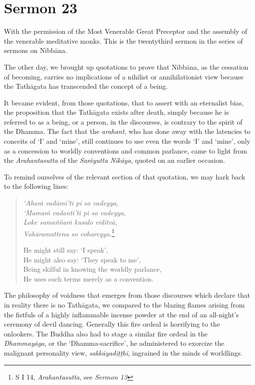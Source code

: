 \chapter{Sermon 23}

\NibbanaOpeningQuote

With the permission of the Most Venerable Great Preceptor and the assembly of the venerable meditative monks. This is the twentythird sermon in the series of sermons on Nibbāna.

The other day, we brought up quotations to prove that Nibbāna, as the cessation of becoming, carries no implications of a nihilist or annihilationist view because the Tathāgata has transcended the concept of a being.

It became evident, from those quotations, that to assert with an eternalist bias, the proposition that the Tathāgata exists after death, simply because he is referred to as a being, or a person, in the discourses, is contrary to the spirit of the Dhamma. The fact that the \emph{arahant}, who has done away with the latencies to conceits of `I' and `mine', still continues to use even the words `I' and `mine', only as a concession to worldly conventions and common parlance, came to light from the \emph{Arahantasutta} of the \emph{Saṁyutta Nikāya}, quoted on an earlier occasion.

To remind ourselves of the relevant section of that quotation, we may hark back to the following lines:

\begin{quote}
\emph{`Ahaṁ vadāmī'ti pi so vadeyya,}\\
\emph{`Mamaṁ vadantī'ti pi so vadeyya,}\\
\emph{Loke samaññaṁ kusalo viditvā,}\\
\emph{Vohāramattena so vohareyya.}\footnote{S I 14, \emph{Arahantasutta}, see \emph{Sermon 13}}

He might still say: `I speak',\\
He might also say: `They speak to me',\\
Being skilful in knowing the worldly parlance,\\
He uses such terms merely as a convention.
\end{quote}

The philosophy of voidness that emerges from those discourses which declare that in reality there is no Tathāgata, we compared to the blazing flames arising from the fistfuls of a highly inflammable incense powder at the end of an all-night's ceremony of devil dancing. Generally this fire ordeal is horrifying to the onlookers. The Buddha also had to stage a similar fire ordeal in the \emph{Dhammayāga}, or the `Dhamma-sacrifice', he administered to exorcize the malignant personality view, \emph{sakkāyadiṭṭhi}, ingrained in the minds of worldlings.

